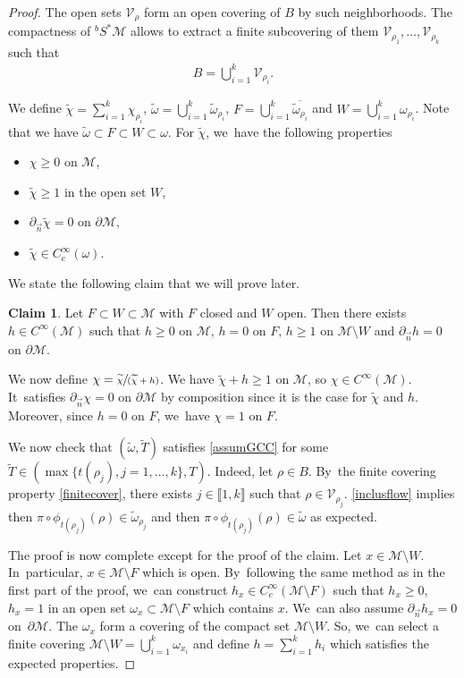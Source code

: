 \documentclass[JEP,XML,SOM,Unicode,published]{cedram}
\newcommand{\spfrac}[2]{\sfrac{#1}{(#2)}}
\theoremstyle{definition}
\newtheorem*{claim}{Claim}
\let\mc\mathcal
\newcommand{\M}{\mc{M}}
\begin{document}
\begin{proof}
The open sets $\mc{V}_{\rho}$ form an open covering of $B$ by such neighborhoods. The compactness of $^bS^*\M$ allows to extract a finite subcovering of them $\mc{V}_{\rho_1},\ldots, \mc{V}_{\rho_k}$ such that
\begin{align}
\label{finitecover}B=\bigcup_{i=1}^{k}\mc{V}_{\rho_{i}}.
\end{align}

We define $\widetilde{\chi}=\sum_{i=1}^{k}\chi_{\rho_{i}}$, $\widetilde{\omega}=\bigcup_{i=1}^{k}\widetilde{\omega}_{\rho_i}$, $F=\bigcup_{i=1}^{k}\overline{\widetilde{\omega}_{\rho_i}}$ and $W=\bigcup_{i=1}^{k}\omega_{\rho_i}$. Note that we have $ \widetilde{\omega}\subset F\subset W\subset \omega$. For $\widetilde{\chi}$, we~have the following properties \begin{itemize}
\item $\chi\geq 0$ on $\M$,
\item $\widetilde{\chi}\geq 1$ in the open set $W$,
\item $\partial_{\vec n}\widetilde{\chi}=0$ on $\partial \M$,
\item $\widetilde{\chi}\in C^{\infty}_c(\omega)$.
\end{itemize}
We state the following claim that we will prove later.

\begin{claim} Let $F\subset W\subset \M$ with $F$ closed and $W$ open. Then there exists $h\in C^{\infty}(\M)$ such that $h\geq 0$ on $\M$, $h=0$ on $F$, $h\geq 1$ on $\M\setminus W$ and $\partial_{\vec n}h=0$ on $\partial \M$.
\end{claim}

We now define $\chi=\spfrac{\widetilde{\chi}}{\widetilde{\chi}+h}$. We have $\widetilde{\chi}+h\geq 1$ on $\M$, so $\chi\in C^{\infty}(\M)$. It~satisfies $\partial_{\vec n}\chi=0$ on $\partial \M$ by composition since it is the case for $\widetilde{\chi}$ and $h$. Moreover, since $h=0$ on $F$, we~have $\chi=1$ on $F$.

We now check that $(\widetilde{\omega},\widetilde{T})$ satisfies \ref{assumGCC} for some $\widetilde{T}\in (\max\{t(\rho_j),j=1,\dots, k\}, T)$.
Indeed, let $\rho \in B$. By~the finite covering property \eqref{finitecover}, there exists $j\in \llbracket 1,k \rrbracket $ such that $\rho\in \mc{V}_{\rho_j}$. \eqref{inclusflow} implies then $\pi\circ\phi_{t(\rho_{j})}(\rho)\in \widetilde{\omega}_{\rho_{j}}$ and then $\pi\circ\phi_{t(\rho_{j})}(\rho)\in\widetilde{\omega}$ as expected.

The proof is now complete except for the proof of the claim.
Let $x\in \M\setminus W$. In~particular, $x\in \M \setminus F$ which is open. By~following the same method as in the first part of the proof, we~can construct $h_{x} \in C^{\infty}_c(\M \setminus F)$ such that $h_{x}\geq 0$, $h_{x}=1$ in an open set $\omega_{x}\subset \M\setminus F$ which contains $x$. We~can also assume $\partial_{\vec n}h_{x}=0$ on~$\partial \M$. The $\omega_{x}$ form a covering of the compact set $\M\setminus W$. So, we~can select a finite covering $\M\setminus W=\bigcup_{i=1}^{k} \omega_{x_{i}}$ and define $h=\sum_{i=1}^{k}h_{i}$ which satisfies the expected properties.
\end{proof}
\end{document}
